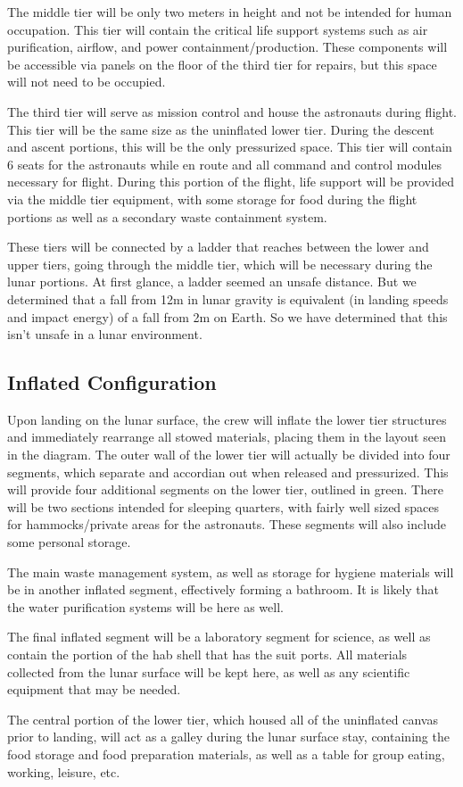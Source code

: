 \documentclass{article}
\begin{document}
The middle tier will be only two meters in height and not be intended for human occupation. This tier will contain the critical life support systems such as air purification, airflow, and power containment/production. These components will be accessible via panels on the floor of the third tier for repairs, but this space will not need to be occupied.

The third tier will serve as mission control and house the astronauts during flight. This tier will be the same size as the uninflated lower tier. During the descent and ascent portions, this will be the only pressurized space. This tier will contain 6 seats for the astronauts while en route and all command and control modules necessary for flight. During this portion of the flight, life support will be provided via the middle tier equipment, with some storage for food during the flight portions as well as a secondary waste containment system.

These tiers will be connected by a ladder that reaches between the lower and upper tiers, going through the middle tier, which will be necessary during the lunar portions. At first glance, a ladder seemed an unsafe distance. But we determined that a fall from 12m in lunar gravity is equivalent (in landing speeds and impact energy) of a fall from 2m on Earth. So we have determined that this isn't unsafe in a lunar environment.

\subsection{Inflated Configuration}

Upon landing on the lunar surface, the crew will inflate the lower tier structures and immediately rearrange all stowed materials, placing them in the layout seen in the diagram. The outer wall of the lower tier will actually be divided into four segments, which separate and accordian out when released and pressurized. This will provide four additional segments on the lower tier, outlined in green. There will be two sections intended for sleeping quarters, with fairly well sized spaces for hammocks/private areas for the astronauts. These segments will also include some personal storage.

The main waste management system, as well as storage for hygiene materials will be in another inflated segment, effectively forming a bathroom. It is likely that the water purification systems will be here as well. 

The final inflated segment will be a laboratory segment for science, as well as contain the portion of the hab shell that has the suit ports. All materials collected from the lunar surface will be kept here, as well as any scientific equipment that may be needed.

The central portion of the lower tier, which housed all of the uninflated canvas prior to landing, will act as a galley during the lunar surface stay, containing the food storage and food preparation materials, as well as a table for group eating, working, leisure, etc.
\end{document}
